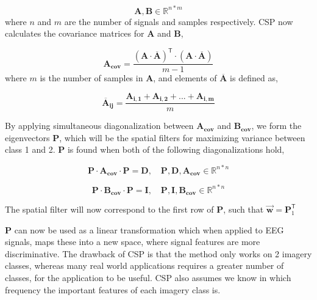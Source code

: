 \begin{equation}
\label{eq:csp_data}
\pmb{A}, \pmb{B} \in \mathbb{R}^{n*m}
\end{equation}
where $n$ and $m$ are the number of signals and samples respectively. CSP now calculates the covariance matrices for $\pmb{A}$ and $\pmb{B}$,

\begin{equation}
\label{eq:covariance_matrice}
\pmb{A_{cov}} = \frac{(\pmb{A} \cdot \overline{\pmb{A}})^\mathsf{T}  \cdot (\pmb{A} \cdot \overline{\pmb{A}})}{m - 1}
\end{equation}
where $m$ is the number of samples in $\pmb{A}$, and elements of $\overline{\pmb{A}}$ is defined as,

\begin{equation}
\label{eq:a_bar}
\pmb{\overline{A}_{ij}} = \frac{\pmb{A_{i,1}} + \pmb{A_{i,2}} + ... + \pmb{A_{i,m}}}{m}
\end{equation}

By applying simultaneous diagonalization between $\pmb{A_{cov}}$ and $\pmb{B_{cov}}$, we form the eigenvectors $\pmb{P}$, which will be the spatial filters for maximizing variance between class 1 and 2. $\pmb{P}$ is found when both of the following diagonalizations hold, 

\begin{equation}
\label{eq:diagonalization_A}
\pmb{P} \cdot \pmb{A_{cov}} \cdot \pmb{P} = \pmb{D}, \quad \pmb{P}, \pmb{D}, \pmb{A_{cov}} \in \mathbb{R}^{n*n}
\end{equation}

\begin{equation}
\label{eq:diagonalization_B}
\pmb{P} \cdot \pmb{B_{cov}} \cdot \pmb{P} = \pmb{I}, \quad \pmb{P}, \pmb{I}, \pmb{B_{cov}} \in \mathbb{R}^{n*n}
\end{equation}

The spatial filter will now correspond to the first row of $\pmb{P}$, such that $\pmb{\vec{w}} = \pmb{P}^\mathsf{T}_{1}$ 

$\pmb{P}$ can now be used as a linear transformation which when applied to EEG signals, maps these into a new space, where signal features are more discriminative. The drawback of CSP is that the method only works on 2 imagery classes, whereas many real world applications requires a greater number of classes, for the application to be useful. CSP also assumes we know in which frequency the important features of each imagery class is.

